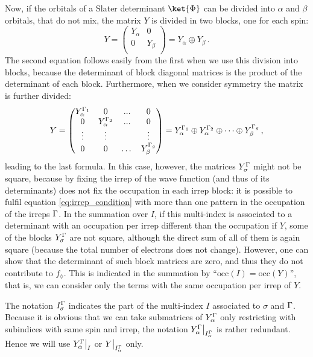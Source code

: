 \documentclass[a4paper,11pt]{article}
\begin{document}
Now, if the orbitals of a Slater determinant $\ket{\Phi}$ can be divided into $\alpha$ and $\beta$ orbitals, that do not mix, the matrix $Y$ is divided in two blocks, one for each spin:
\begin{equation}
  Y =
  \begin{pmatrix}
    Y_\alpha & 0\\
    0 & Y_\beta\\
  \end{pmatrix}
  = Y_\alpha \oplus Y_\beta\,.
\end{equation}
The second equation follows easily from the first when we use this division into blocks, because the determinant of block diagonal matrices is the product of the determinant of each block.
Furthermore, when we consider symmetry the matrix is further divided:
\begin{equation}\label{eq:Y_spin_irrep_blocks}
  Y =
  \begin{pmatrix}
    Y_\alpha^{\Gamma_1} & 0 & ... & 0\\
    0 & Y_\alpha^{\Gamma_2} & ... & 0 \\
    \vdots & \vdots & & \vdots\\
    0 & 0 &\dots & Y_\beta^{\Gamma_g}\\
  \end{pmatrix}
  = Y_\alpha^{\Gamma_1} \oplus Y_\alpha^{\Gamma_2} \oplus \dots \oplus Y_\beta^{\Gamma_g}\,,
\end{equation}
leading to the last formula.
In this case, however, the matrices $Y_\sigma^{\Gamma}$ might not be square, because by fixing the irrep of the wave function (and thus of its determinants) does not fix the occupation in each irrep block:
it is possible to fulfil equation \eqref{eq:irrep_condition} with more than one pattern in the occupation of the irreps $\Gamma$.
In the summation over $I$, if this multi-index is associated to a determinant with an occupation per irrep different than the occupation if $Y$, some of the blocks $Y_\sigma^{\Gamma}$ are not square, although the direct sum of all of them is again square (because the total number of electrons does not change).
However, one can show that the determinant of such block matrices are zero, and thus they do not contribute to $f_\lozenge$.
This is indicated in the summation by ``$\text{occ}(I) = \text{occ}(Y)$'', that is, we can consider only the terms with the same occupation per irrep of $Y$.

The notation $I_\sigma^{\Gamma}$ indicates the part of the multi-index $I$ associated to $\sigma$ and $\Gamma$.
Because it is obvious that we can take submatrices of $Y_\alpha^{\Gamma}$ only restricting with subindices with same spin and irrep, the notation $Y_\alpha^{\Gamma}\big|_{I_\alpha^{\Gamma}}$ is rather redundant.
Hence we will use $Y_\alpha^{\Gamma}\big|_{I}$ or $Y\big|_{I_\alpha^{\Gamma}}$ only.
\end{document}
